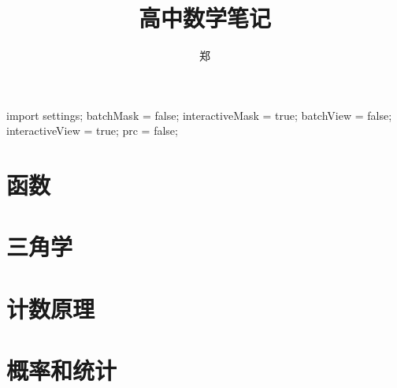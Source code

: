 \documentclass[a4paper, openany, UTF8]{ctexbook}
\title{{\Huge 高中数学笔记}}
\author{郑}
\begin{document}
	\begin{asydef}
		import settings;
		batchMask = false;
		interactiveMask = true;
		batchView = false;
		interactiveView = true;
		prc = false;
	\end{asydef}

	\frontmatter
	\setcounter{tocdepth}{1}
	\maketitle

	

	\tableofcontents
	\clearpage
	\mainmatter
	\raggedbottom

	\part{函数}
	

	\part{三角学}
	
	

	\part{计数原理}
	
	

	\part{概率和统计}
	
\end{document}
